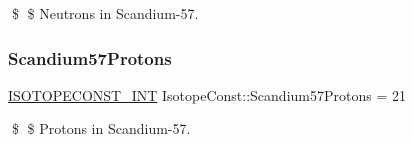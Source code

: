 \$ \$ Neutrons in Scandium-\/57. \mbox{\label{group___isotope_const-_scandium-_sc57_ga127ad611692a7a7b9c477d9471a3cb0b}} 
\subsubsection{\texorpdfstring{Scandium57\+Protons}{Scandium57Protons}}
{\footnotesize\ttfamily \mbox{\hyperlink{group___isotope_const-_macros_ga5f18360b3e99483a35c32d789e62621c}{I\+S\+O\+T\+O\+P\+E\+C\+O\+N\+S\+T\+\_\+\+I\+NT}} Isotope\+Const\+::\+Scandium57\+Protons = 21}

\$ \$ Protons in Scandium-\/57. 